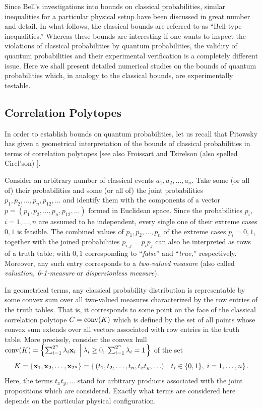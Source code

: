\documentclass[pra,showpacs,showkeys,amsfonts]{revtex4}
\begin{document}
Since Bell's investigations \cite{bell-87,clauser,peres} into bounds on classical probabilities,
similar inequalities for a particular physical setup have
been discussed in great number and detail.
In what follows, the classical bounds are referred to as ``Bell-type inequalities.''
Whereas these bounds are interesting
if one wants to inspect
the violations of classical probabilities by quantum probabilities,
the validity of quantum probabilities and their experimental verification is a completely
different issue.
Here we shall present detailed numerical studies on the bounds of quantum probabilities which,
in analogy to the classical bounds, are experimentally testable.

\subsection{Correlation Polytopes}

In order to establish bounds on quantum probabilities, let us recall that
Pitowsky has given a geometrical interpretation of the bounds of classical probabilities
in terms of correlation polytopes \cite{pitowsky-86,pitowsky,pitowsky-89a,Pit-91,Pit-94}
[see also Froissart \cite{froissart-81} and
Tsirelson (also spelled Cirel'son) \cite{cirelson:80,cirelson}].

Consider an arbitrary number of classical events $a_1, a_2,\ldots , a_n$.
Take some (or all of) their probabilities
and some (or all of) the joint probabilities
$p_1, p_2,\ldots , p_n, p_{12},\ldots $
and identify them with the components of
a vector  $p=(p_1, p_2,\ldots , p_n, p_{12},\ldots )$
formed in Euclidean space.
Since the probabilities $p_i$, $i=1,\ldots ,n$ are assumed to be independent,
every single one of their extreme cases $0,1$ is feasible.
The combined values of $p_1, p_2,\ldots , p_n$ of the extreme cases $p_i=0,1$,
together with the joined probabilities $p_{i,j} =p_i p_j$
can also be interpreted as rows of a truth table; with $0,1$ corresponding to
``{\it false}'' and
``{\it true,}'' respectively.
Moreover, any such entry corresponds to a {\em two-valued measure}
(also called {\em valuation, 0-1-measure} or {\em dispersionless measure}).

In geometrical terms,
any classical probability distribution is representable by some convex sum over
all two-valued measures characterized by the row entries of the truth tables.
That is, it corresponds to
some point on the face of the classical correlation polytope $C={\rm conv} (K)$
which is defined by the set of all points whose
convex sum extends over all vectors associated with row entries in the truth table.
More precisely,
consider the convex hull
${\rm conv} (K)=\left\{ \sum_{i=1}^{2^n} \lambda_i{\bf x}_i
  \; \left|  \;
\lambda_i\ge 0,\; \sum_{i=1}^{2^n}\lambda_i =1
\right.
\right\} $
of the set
$$K
=\{{\bf x}_1,{\bf x}_2,\ldots ,{\bf x}_{2^n}\}
= \left\{
\left.
\large(t_1, t_2,\ldots , t_n, t_xt_y,\ldots \large)
\; \right| \;
t_i \in \{0,1\},\; i=1,\ldots ,n
\right\}.$$
Here, the terms $t_xt_y,\ldots$ stand for arbitrary products associated with
the joint propositions which are considered. Exactly what terms  are
considered here depends on the particular physical configuration.
\end{document}
